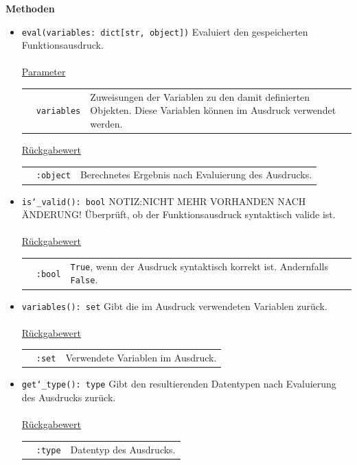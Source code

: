 \documentclass{article}
\begin{document}
\textbf{{Methoden}}
\begin{itemize}
\item \texttt{eval(variables: dict[str, object])} \newline Evaluiert den gespeicherten Funktionsausdruck.
\\\\
\underline{{Parameter}}

\begin{tabular}{lll}
 & \texttt{variables} & Zuweisungen der Variablen zu den damit definierten Objekten. Diese Variablen können im Ausdruck verwendet werden. \\
\end{tabular}

\underline{{Rückgabewert}}

\begin{tabular}{lll}
 & \texttt{:object} & Berechnetes Ergebnis nach Evaluierung des Ausdrucks. \\
\end{tabular}

\item \texttt{is\char`_valid(): bool} \newline NOTIZ:NICHT MEHR VORHANDEN NACH ÄNDERUNG! Überprüft, ob der Funktionsausdruck syntaktisch valide ist.
\\\\
\underline{{Rückgabewert}}

\begin{tabular}{lll}
 & \texttt{:bool} & \texttt{True}, wenn der Ausdruck syntaktisch korrekt ist. Andernfalls \texttt{False}. \\
\end{tabular}

\item \texttt{variables(): set} \newline Gibt die im Ausdruck verwendeten Variablen zurück.
\\\\
\underline{{Rückgabewert}}

\begin{tabular}{lll}
 & \texttt{:set} & Verwendete Variablen im Ausdruck. \\
\end{tabular}

\item \texttt{get\char`_type(): type} \newline Gibt den resultierenden Datentypen nach Evaluierung des Ausdrucks zurück.
\\\\
\underline{{Rückgabewert}}

\begin{tabular}{lll}
 & \texttt{:type} & Datentyp des Ausdrucks. \\
\end{tabular}
\end{itemize}
\end{document}
